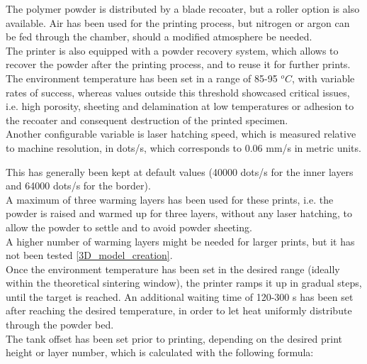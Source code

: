\documentclass{article}
\begin{document}
        The polymer powder is distributed by a blade recoater, but a roller option is also available. 
        Air has been used for the printing process, but nitrogen or argon can be fed through the chamber, 
        should a modified atmosphere be needed.  \\

        The printer is also equipped with a powder recovery system, which allows to recover the powder 
        after the printing process, and to reuse it for further prints. \\ 

        The environment temperature has been set in a range of 85-95 $^oC$, with variable rates of success, 
        whereas values outside this threshold showcased critical issues, i.e. high porosity, sheeting and 
        delamination at low temperatures or adhesion to the recoater and consequent destruction of the printed specimen. \\ 

        Another configurable variable is laser hatching speed, which is measured relative to machine resolution, in dots/s, 
        which corresponds to 0.06 mm/s in metric units. 

        This has generally been kept at default values (40000 dots/s for the inner layers and 64000 dots/s for the border).  \\ 

        A maximum of three warming layers has been used for these prints, i.e. the powder is raised and warmed 
        up for three layers, without any laser hatching, to allow the powder to settle and to avoid 
        powder sheeting. \\ 
        A higher number of warming layers might be needed for larger prints, but it has not been tested 
        \ref{3D_model_creation}. \\

        Once the environment temperature has been set in the desired range (ideally within the theoretical 
        sintering window), the printer ramps it up in gradual steps, until the target is reached.  
        An additional waiting time of 120-300 s has been set after reaching the desired temperature, in order to let heat 
        uniformly distribute through the powder bed. \\

        The tank offset has been set prior to printing, depending on the desired print height or 
        layer number, which is calculated with the following formula: \\
        
\end{document}
